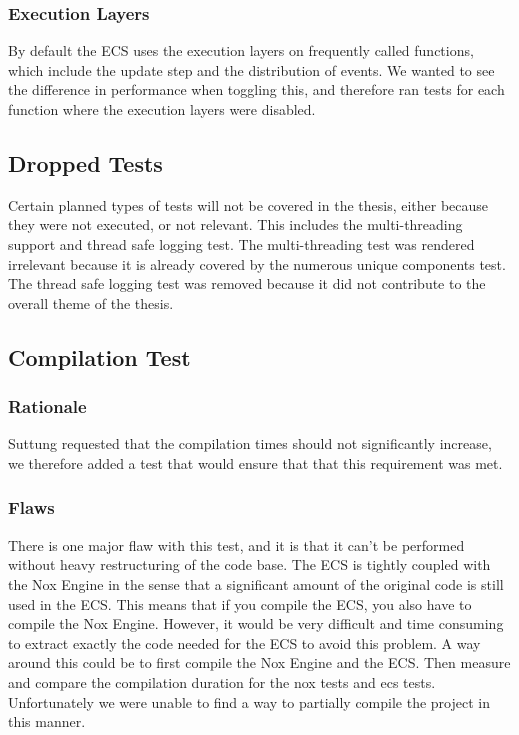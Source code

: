 \subsubsection{Execution Layers}
By default the ECS uses the execution layers on frequently called functions,
which include the update step and the distribution of events.
We wanted to see the difference in performance when toggling this,
and therefore ran tests for each function where the execution layers were disabled.

\subsection{Dropped Tests}
Certain planned types of tests will not be covered in the thesis, either because they were not executed, or not relevant.
This includes the multi-threading support and thread safe logging test.
The multi-threading test was rendered irrelevant because it is already covered by the numerous unique components test.
The thread safe logging test was removed because it did not contribute to the overall theme of the thesis.

\subsection{Compilation Test}
\subsubsection{Rationale}
Suttung requested that the compilation times should not significantly increase,
we therefore added a test that would ensure that that this requirement was met.

\subsubsection{Flaws}
There is one major flaw with this test, and it is that it can't be performed without heavy restructuring of the code base.
The ECS is tightly coupled with the Nox Engine in the sense that a significant amount of the original code is still used in the ECS.
This means that if you compile the ECS, you also have to compile the Nox Engine.
However, it would be very difficult and time consuming to extract exactly the code needed for the ECS to avoid this problem.
A way around this could be to first compile the Nox Engine and the ECS.
Then measure and compare the compilation duration for the nox tests and ecs tests.
Unfortunately we were unable to find a way to partially compile the project in this manner.

